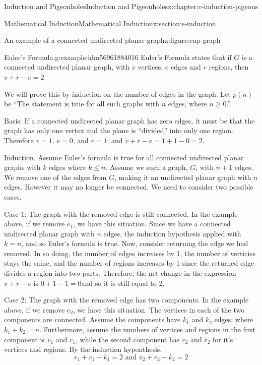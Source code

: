 \documentclass[twoside,10pt,]{book}
\numberwithin{equation}{section}
\begin{document}
\begin{chapterptx}{Induction and Pigeonholes}{}{Induction and Pigeonholes}{}{}{x:chapter:c-induction-pigeons}
\begin{sectionptx}{Mathematical Induction}{}{Mathematical Induction}{}{}{x:section:s-induction}
\begin{figureptx}{An example of a connected undirected planar graph}{x:figure:cup-graph}{}
\begin{image}{0}{1}{0}
\end{image}%
\tcblower
\end{figureptx}%
\begin{example}{Euler's Formula.}{g:example:idm56961884016}%
%
Euler's Formula states that if \(G\) is a connected undirected planar graph, with \(v\) vertices, \(e\) edges and \(r\) regions, then \(v+r-e=2\)%
\par
We will prove this by induction on the number of edges in the graph.  Let \(p(n)\) be ``The statement is true for all such graphs with \(n\) edges, where \(n\geq 0\).''%
\par
Basis:  If a connected undirected planar graph has zero edges, it must be that the graph has only one vertex and the plane is  ``divided'' into only one region.  Therefore \(v=1\), \(e=0\), and \(r=1\); and   \(v+r-e=1+1-0 =2\).%
\par
Induction.  Assume Euler's formula is true for all connected undirected planar graphs  with \(k\) edges where \(k\leq n\).   Assume we such a graph, \(G\), with \(n+1\) edges.  We remove one of the edges from \(G\), making it an undirected planar graph with \(n\) edges.  However it may no longer be connected.  We need to consider two possible cases.%
\par
Case 1:  The graph with the removed edge is still connected. In the example above, if we remove \(e_1\), we have this situation.  Since we have a connected undirected planar graph with \(n\) edges, the induction hypothesis applied with \(k=n\), and so Euler's formula is true.  Now, consider returning the edge we had removed.  In so doing, the number of edges increases by 1, the number of verticies stays the same, and the number of regions increases by 1 since the returned edge divides a region into two parts.  Therefore, the net change in the expression \(v+r-e\) is \(0+1-1=0\)and so it is still equal to 2.%
\par
Case 2: The graph with the removed edge has two components. In the example above, if we remove \(e_2\), we have this situation.   The vertices in each of the two components are connected.  Assume the components have \(k_1\) and \(k_2\) edges, where \(k_1+k_2= n\).  Furthermore, assume the numbers of vertices and regions in the first component is \(v_1\) and \(r_1\), while the second component has \(v_2\) and \(r_2\) for it\textbraceleft{}'\textbraceright{}s vertices and regions. By the induction hyponthesis,%
\begin{equation*}
v_1+r_1-k_1=2 \textrm{ and } v_2+r_2-k_2=2

\end{equation*}
\end{example}
\end{sectionptx}
\end{chapterptx}
\end{document}
